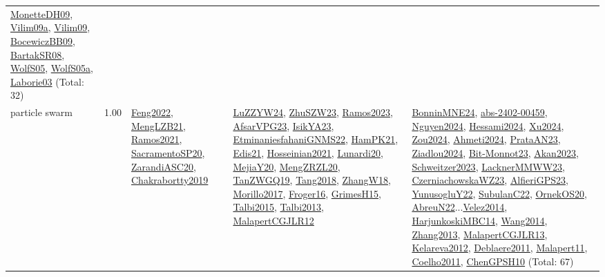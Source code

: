{\begin{longtable}{p{3cm}r>{\raggedright\arraybackslash}p{6cm}>{\raggedright\arraybackslash}p{6cm}>{\raggedright\arraybackslash}p{8cm}}
\hyperref[detail:MonetteDH09]{MonetteDH09}, \hyperref[detail:Vilim09a]{Vilim09a}, \hyperref[detail:Vilim09]{Vilim09}, \hyperref[detail:BocewiczBB09]{BocewiczBB09}, \hyperref[detail:BartakSR08]{BartakSR08}, \hyperref[detail:WolfS05]{WolfS05}, \hyperref[detail:WolfS05a]{WolfS05a}, \hyperref[detail:Laborie03]{Laborie03} (Total: 32)\\
\index{particle swarm}\index{Algorithms!particle swarm}particle swarm &  1.00 & \hyperref[detail:Feng2022]{Feng2022}, \hyperref[detail:MengLZB21]{MengLZB21}, \hyperref[detail:Ramos2021]{Ramos2021}, \hyperref[detail:SacramentoSP20]{SacramentoSP20}, \hyperref[detail:ZarandiASC20]{ZarandiASC20}, \hyperref[detail:Chakrabortty2019]{Chakrabortty2019} & \hyperref[detail:LuZZYW24]{LuZZYW24}, \hyperref[detail:ZhuSZW23]{ZhuSZW23}, \hyperref[detail:Ramos2023]{Ramos2023}, \hyperref[detail:AfsarVPG23]{AfsarVPG23}, \hyperref[detail:IsikYA23]{IsikYA23}, \hyperref[detail:EtminaniesfahaniGNMS22]{EtminaniesfahaniGNMS22}, \hyperref[detail:HamPK21]{HamPK21}, \hyperref[detail:Edis21]{Edis21}, \hyperref[detail:Hosseinian2021]{Hosseinian2021}, \hyperref[detail:Lunardi20]{Lunardi20}, \hyperref[detail:MejiaY20]{MejiaY20}, \hyperref[detail:MengZRZL20]{MengZRZL20}, \hyperref[detail:TanZWGQ19]{TanZWGQ19}, \hyperref[detail:Tang2018]{Tang2018}, \hyperref[detail:ZhangW18]{ZhangW18}, \hyperref[detail:Morillo2017]{Morillo2017}, \hyperref[detail:Froger16]{Froger16}, \hyperref[detail:GrimesH15]{GrimesH15}, \hyperref[detail:Talbi2015]{Talbi2015}, \hyperref[detail:Talbi2013]{Talbi2013}, \hyperref[detail:MalapertCGJLR12]{MalapertCGJLR12} & \hyperref[detail:BonninMNE24]{BonninMNE24}, \hyperref[detail:abs-2402-00459]{abs-2402-00459}, \hyperref[detail:Nguyen2024]{Nguyen2024}, \hyperref[detail:Hessami2024]{Hessami2024}, \hyperref[detail:Xu2024]{Xu2024}, \hyperref[detail:Zou2024]{Zou2024}, \hyperref[detail:Ahmeti2024]{Ahmeti2024}, \hyperref[detail:PrataAN23]{PrataAN23}, \hyperref[detail:Ziadlou2024]{Ziadlou2024}, \hyperref[detail:Bit-Monnot23]{Bit-Monnot23}, \hyperref[detail:Akan2023]{Akan2023}, \hyperref[detail:Schweitzer2023]{Schweitzer2023}, \hyperref[detail:LacknerMMWW23]{LacknerMMWW23}, \hyperref[detail:CzerniachowskaWZ23]{CzerniachowskaWZ23}, \hyperref[detail:AlfieriGPS23]{AlfieriGPS23}, \hyperref[detail:YunusogluY22]{YunusogluY22}, \hyperref[detail:SubulanC22]{SubulanC22}, \hyperref[detail:OrnekOS20]{OrnekOS20}, \hyperref[detail:AbreuN22]{AbreuN22}...\hyperref[detail:Velez2014]{Velez2014}, \hyperref[detail:HarjunkoskiMBC14]{HarjunkoskiMBC14}, \hyperref[detail:Wang2014]{Wang2014}, \hyperref[detail:Zhang2013]{Zhang2013}, \hyperref[detail:MalapertCGJLR13]{MalapertCGJLR13}, \hyperref[detail:Kelareva2012]{Kelareva2012}, \hyperref[detail:Deblaere2011]{Deblaere2011}, \hyperref[detail:Malapert11]{Malapert11}, \hyperref[detail:Coelho2011]{Coelho2011}, \hyperref[detail:ChenGPSH10]{ChenGPSH10} (Total: 67)\\

\end{longtable}}
